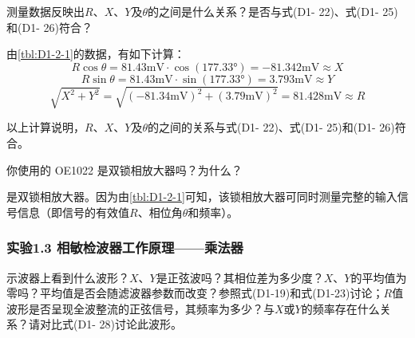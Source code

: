 \documentclass[dvipsnames, svgnames,a4paper,11pt]{article}
\begin{document}
		\begin{tcolorbox}[colback=yellow!20, colframe=black!75, title=【问题 3】]
			测量数据反映出$R$、$X$、$Y$及$\theta$的之间是什么关系？是否与式(D1- 22)、式(D1- 25)和(D1- 26)符合？
		\end{tcolorbox}

		由\cref{tbl:D1-2-1}的数据，有如下计算：
		\[
			R \cos\theta = 81.43 \mathrm{mV} \cdot \cos(177.33°) = -81.342 \mathrm{mV} \approx X 
		\]
		\[
			R \sin\theta = 81.43 \mathrm{mV} \cdot \sin(177.33°) = 3.793 \mathrm{mV} \approx Y 
		\]
		\[
			\sqrt{X^2 + Y^2} = \sqrt{(-81.34 \mathrm{mV})^2 + (3.79 \mathrm{mV})^2} = 81.428 \mathrm{mV} \approx R
		\]

		以上计算说明，$R$、$X$、$Y$及$\theta$的之间的关系与式(D1- 22)、式(D1- 25)和(D1- 26)符合。


		\vspace{0.05\textwidth} %

		\begin{tcolorbox}[colback=yellow!20, colframe=black!75, title=【问题 4】]
			你使用的 OE1022 是双锁相放大器吗？为什么？
		\end{tcolorbox}

		是双锁相放大器。因为由\cref{tbl:D1-2-1}可知，该锁相放大器可同时测量完整的输入信号信息（即信号的有效值$R$、相位角$\theta$和频率）。



	\subsubsection*{实验1.3 \quad 相敏检波器工作原理——乘法器}


		\begin{tcolorbox}[colback=yellow!20, colframe=black!75, title=【问题 5】]
			示波器上看到什么波形？$X$、$Y$是正弦波吗？其相位差为多少度？$X$、$Y$的平均值为零吗？平均值是否会随滤波器参数而改变？参照式(D1-19)和式(D1-23)讨论；$R$值波形是否呈现全波整流的正弦信号，其频率为多少？与$X$或$Y$的频率存在什么关系？请对比式(D1- 28)讨论此波形。
		\end{tcolorbox}
\end{document}
